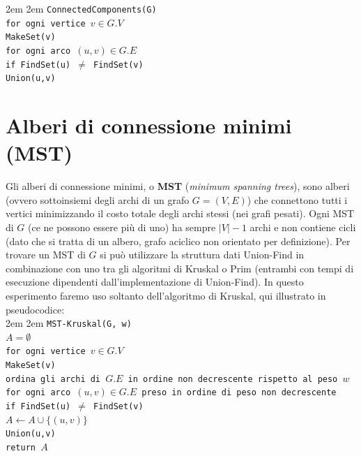 \documentclass[]{article}
\def\code#1{\texttt{#1}} %
\begin{document}
\begingroup
\leftskip2em \rightskip2em
\noindent \code{ConnectedComponents(G)}\\
\indent\code{for ogni vertice $v \in G.V$}\\
\indent\indent\code{MakeSet(v)}\\
\indent\code{for ogni arco $(u, v) \in G.E$}\\
\indent\indent\code{if FindSet(u) $\neq$ FindSet(v)}\\
\indent\indent\indent\code{Union(u,v)}
\par
\endgroup

\section {Alberi di connessione minimi (MST)}
Gli alberi di connessione minimi, o {\bf MST} ({\em minimum spanning trees}), sono alberi (ovvero sottoinsiemi degli archi di un grafo $G = (V,E)$) che connettono tutti i vertici minimizzando il costo totale degli archi stessi (nei grafi pesati). Ogni MST di $G$ (ce ne possono essere più di uno) ha sempre $|V|-1$ archi e non contiene cicli (dato che si tratta di un albero, grafo aciclico non orientato per definizione). Per trovare un MST di $G$ si può utilizzare la struttura dati Union-Find in combinazione con uno tra gli algoritmi di Kruskal o Prim (entrambi con tempi di esecuzione dipendenti dall'implementazione di Union-Find). In questo esperimento faremo uso soltanto dell'algoritmo di Kruskal, qui illustrato in pseudocodice:\\

\begingroup
\leftskip2em \rightskip2em
\noindent \code{MST-Kruskal(G, w)}\\
\indent\code{$A = \emptyset$}\\
\indent\code{for ogni vertice $v \in G.V$}\\
\indent\indent\code{MakeSet(v)}\\
\indent\code{ordina gli archi di $G.E$ in ordine non decrescente rispetto al peso $w$}\\
\indent\code{for ogni arco $(u, v) \in G.E$ preso in ordine di peso non decrescente}\\
\indent\indent\code{if FindSet(u) $\neq$ FindSet(v)}\\
\indent\indent\indent\code{$A \leftarrow A \cup \{(u,v)\}$}\\
\indent\indent\indent\code{Union(u,v)}\\
\indent\code{return $A$}
\par
\endgroup
\end{document}
